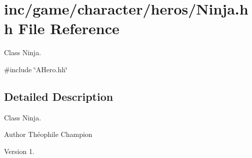 \hypertarget{Ninja_8hh}{}\section{inc/game/character/heros/\+Ninja.hh File Reference}
\label{Ninja_8hh}


Class Ninja.  


{\ttfamily \#include \char`\"{}A\+Hero.\+hh\char`\"{}}\newline


\subsection{Detailed Description}
Class Ninja. 

\begin{DoxyAuthor}{Author}
Théophile Champion 
\end{DoxyAuthor}
\begin{DoxyVersion}{Version}
1. 
\end{DoxyVersion}
